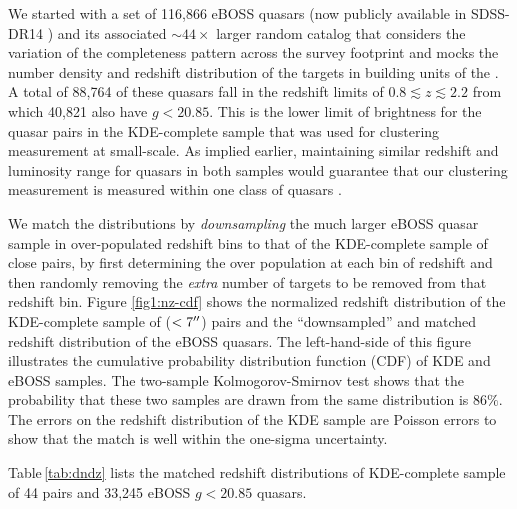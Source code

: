 \documentclass[useAMS,usenatbib]{mn2e}
\begin{document}
We started with a set of 116{,}866 eBOSS quasars (now publicly available in SDSS-DR14 \citet{dr14}) and its associated $\sim 44 \times$ larger random catalog that considers the variation of the completeness pattern across the survey footprint and mocks the number density and redshift distribution of the targets in building units of the \citet[see][]{sw08b,la17}. A total of 88{,}764 of these quasars fall in the redshift limits of $0.8\lesssim z \lesssim 2.2$ from which 40{,}821 also have $g<20.85$. This is the lower limit of brightness for the quasar pairs in the KDE-complete sample that was used for clustering measurement at small-scale. As implied earlier, maintaining similar redshift and luminosity range for quasars in both samples would guarantee that our clustering measurement is measured within one class of quasars \citep[see, e.g., ][for discussions on whether quasars from different luminosity classes possess different clustering properties]{she07,All11,sh13,All14,ef15,mg16}.     

We match the distributions by {\it downsampling} the much larger eBOSS quasar sample in over-populated redshift bins to that of the KDE-complete sample of close pairs, by first determining the over population at each bin of redshift and then randomly removing the {\it extra} number of targets to be removed from that redshift bin. Figure \ref{fig1:nz-cdf} shows the normalized redshift distribution of the KDE-complete sample of ($<7 \arcsec$) pairs and the ``downsampled'' and matched redshift distribution of the eBOSS quasars. The left-hand-side of this figure illustrates the cumulative probability distribution function (CDF) of KDE and eBOSS samples. The two-sample Kolmogorov-Smirnov test shows that the probability that these two samples are drawn from the same distribution is $86\%$. The errors on the redshift distribution of the KDE sample are Poisson errors to show that the match is well within the one-sigma uncertainty. 
 
 Table\,\ref{tab:dndz} lists the matched redshift distributions of KDE-complete sample of 44 pairs and 33{,}245 eBOSS $g<20.85$ quasars. 
  
\end{document}
